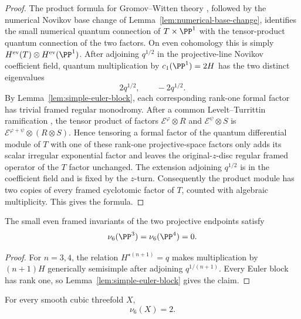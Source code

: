 \begin{proof}
The product formula for Gromov--Witten theory
\cite{BehrendProduct}, followed by the numerical Novikov base change of
Lemma~\ref{lem:numerical-base-change}, identifies the small numerical
quantum connection of $T\times\PP^1$ with the tensor-product quantum
connection of the two factors.  On even cohomology this is simply
$H^{\rm ev}(T)\otimes H^{\rm ev}(\PP^1)$.  After adjoining $q^{1/2}$ in
the projective-line Novikov coefficient field, quantum multiplication by
$c_1(\PP^1)=2H$ has the two distinct eigenvalues
\[
 2q^{1/2},\qquad -2q^{1/2}.
\]
By Lemma~\ref{lem:simple-euler-block}, each corresponding rank-one formal
factor has trivial framed regular monodromy.  After a common
Levelt--Turrittin ramification \cite[Chapter~3]{PutSinger}, the tensor product
of factors \(\mathcal E^\varphi\otimes R\) and
\(\mathcal E^\psi\otimes S\) is
\(\mathcal E^{\varphi+\psi}\otimes(R\otimes S)\).  Hence tensoring a formal
factor of the quantum differential module of $T$ with one of these rank-one
projective-space factors only adds its
scalar irregular exponential factor and leaves the original-$z$-disc
regular framed operator of the $T$ factor unchanged.  The extension adjoining
$q^{1/2}$ is in the coefficient field and is fixed by the $z$-turn.
Consequently the product module has two copies of every framed cyclotomic
factor of $T$, counted with algebraic multiplicity.  This gives the formula.
\end{proof}

\begin{corollary}\label{cor:p3-nu6}
%
%
The small even framed invariants of the two projective endpoints satisfy
\[
 \nu_6(\PP^3)=\nu_6(\PP^4)=0.
\]
\end{corollary}

\begin{proof}
For $n=3,4$, the relation $H^{\star(n+1)}=q$ makes multiplication by
$(n+1)H$ generically semisimple after adjoining $q^{1/(n+1)}$.  Every Euler
block has rank one, so Lemma~\ref{lem:simple-euler-block} gives the claim.
\end{proof}

\begin{proposition}
\label{prop:cubic-packet}
%
%
For every smooth cubic threefold \(X\),
\[
 \nu_6(X)=2.
 \label{eq:cubic-packet-value}
\]
\end{proposition}

